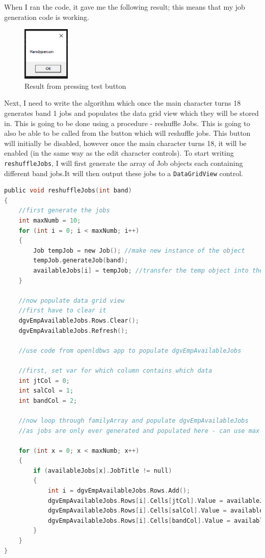 When I ran the code, it gave me the following result; this means that my job generation code is working.
\begin{figure}[H]
    \centering
    \includegraphics[width=0.2\textwidth]{images/implementation/jobs2.png}
    \caption{Result from pressing test button}
    \label{fig:implementation-jobs2}
\end{figure}
\noindent Next, I need to write the algorithm which once the main character turns 18 generates band 1 jobs and populates the data grid view which they will be stored in. This is going to be done using a procedure - reshuffle Jobs. This is going to also be able to be called from the button which will reshuffle jobs. This button will initially be disabled, however once the main character turns 18, it will be enabled (in the same way as the edit character controls).
To start writing \verb|reshuffleJobs|, I will first generate the array of Job objects each containing different band jobs.It will then output these jobs to a \verb|DataGridView| control.
\begin{lstlisting}[language=c, style=csharp, caption=Reshuffle available jobs algorithm]
public void reshuffleJobs(int band)
{
    //first generate the jobs
    int maxNumb = 10;
    for (int i = 0; i < maxNumb; i++)
    {
        Job tempJob = new Job(); //make new instance of the object
        tempJob.generateJob(band); 
        availableJobs[i] = tempJob; //transfer the temp object into the array.
    }

    //now populate data grid view
    //first have to clear it
    dgvEmpAvailableJobs.Rows.Clear();
    dgvEmpAvailableJobs.Refresh();

    //use code from openldbws app to populate dgvEmpAvailableJobs

    //first, set var for which column contains which data
    int jtCol = 0;
    int salCol = 1;
    int bandCol = 2;

    //now loop through familyArray and populate dgvEmpAvailableJobs
    //as jobs are only ever generated and populated here - can use max number from job generation loop for loop here

    for (int x = 0; x < maxNumb; x++)
    {
        if (availableJobs[x].JobTitle != null)
        {
            int i = dgvEmpAvailableJobs.Rows.Add();
            dgvEmpAvailableJobs.Rows[i].Cells[jtCol].Value = availableJobs[x].JobTitle;
            dgvEmpAvailableJobs.Rows[i].Cells[salCol].Value = availableJobs[x].Salary;
            dgvEmpAvailableJobs.Rows[i].Cells[bandCol].Value = availableJobs[x].Band;
        }
    }
}
\end{lstlisting}
